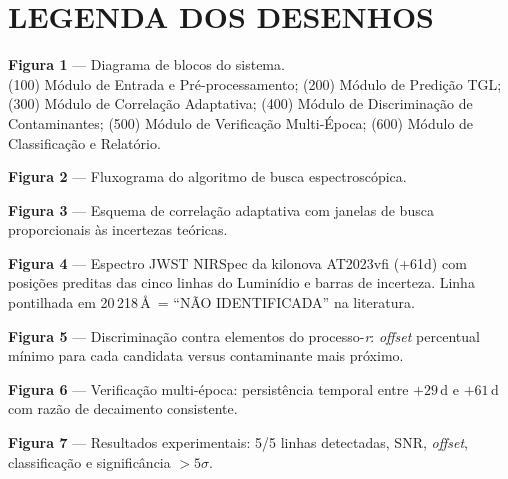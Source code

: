\documentclass[12pt,a4paper]{article}
\begin{document}
\newpage
\section*{LEGENDA DOS DESENHOS}

\textbf{Figura 1} --- Diagrama de blocos do sistema.\\
(100) Módulo de Entrada e Pré-processamento;
(200) Módulo de Predição TGL;
(300) Módulo de Correlação Adaptativa;
(400) Módulo de Discriminação de Contaminantes;
(500) Módulo de Verificação Multi-Época;
(600) Módulo de Classificação e Relatório.

\textbf{Figura 2} --- Fluxograma do algoritmo de busca
espectroscópica.

\textbf{Figura 3} --- Esquema de correlação adaptativa com janelas
de busca proporcionais às incertezas teóricas.

\textbf{Figura 4} --- Espectro JWST NIRSpec da kilonova AT2023vfi
(+61d) com posições preditas das cinco linhas do Luminídio e
barras de incerteza. Linha pontilhada em 20\,218\,\AA\ = ``NÃO
IDENTIFICADA'' na literatura.

\textbf{Figura 5} --- Discriminação contra elementos do
processo-\textit{r}: \textit{offset} percentual mínimo para cada
candidata versus contaminante mais próximo.

\textbf{Figura 6} --- Verificação multi-época: persistência
temporal entre $+29$\,d e $+61$\,d com razão de decaimento
consistente.

\textbf{Figura 7} --- Resultados experimentais: 5/5 linhas
detectadas, SNR, \textit{offset}, classificação e significância
$> 5\sigma$.
\end{document}
